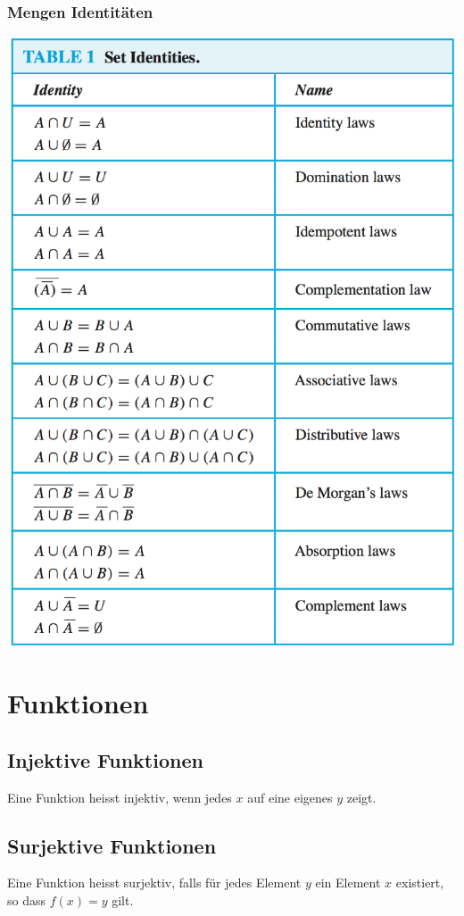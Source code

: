 \documentclass[12pt]{scrartcl}
\begin{document}
\subsubsection{Mengen Identitäten}
\includegraphics[width=15cm]{img/set_identities.png }




\section{Funktionen}
\subsection{Injektive Funktionen}
Eine Funktion heisst injektiv, wenn jedes $x$ auf eine eigenes $y$ zeigt.

\subsection{Surjektive Funktionen}
Eine Funktion heisst surjektiv, falls für jedes Element $y$ ein Element $x$ existiert, so dass $f(x) = y$ gilt.
\end{document}
